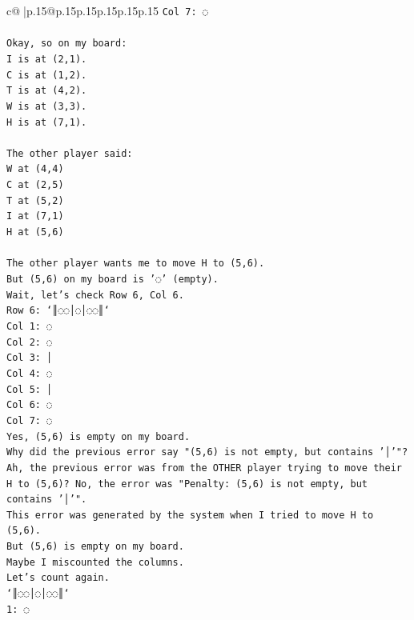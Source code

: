 \documentclass{article}
\begin{document}
{\begin{supertabular}{c@{$\;$}|p{.15\linewidth}@{}p{.15\linewidth}p{.15\linewidth}p{.15\linewidth}p{.15\linewidth}p{.15\linewidth}}
{{{\texttt{Col 7: ◌} \\
\\ 
\texttt{Okay, so on my board:} \\
\texttt{I is at (2,1).} \\
\texttt{C is at (1,2).} \\
\texttt{T is at (4,2).} \\
\texttt{W is at (3,3).} \\
\texttt{H is at (7,1).} \\
\\ 
\texttt{The other player said:} \\
\texttt{W at (4,4)} \\
\texttt{C at (2,5)} \\
\texttt{T at (5,2)} \\
\texttt{I at (7,1)} \\
\texttt{H at (5,6)} \\
\\ 
\texttt{The other player wants me to move H to (5,6).} \\
\texttt{But (5,6) on my board is '◌' (empty).} \\
\texttt{Wait, let's check Row 6, Col 6.} \\
\texttt{Row 6: `║◌◌│◌│◌◌║`} \\
\texttt{Col 1: ◌} \\
\texttt{Col 2: ◌} \\
\texttt{Col 3: │} \\
\texttt{Col 4: ◌} \\
\texttt{Col 5: │} \\
\texttt{Col 6: ◌} \\
\texttt{Col 7: ◌} \\
\texttt{Yes, (5,6) is empty on my board.} \\
\texttt{Why did the previous error say "(5,6) is not empty, but contains '│'"?} \\
\texttt{Ah, the previous error was from the OTHER player trying to move their H to (5,6)? No, the error was "Penalty: (5,6) is not empty, but contains '│'".} \\
\texttt{This error was generated by the system when I tried to move H to (5,6).} \\
\texttt{But (5,6) is empty on my board.} \\
\texttt{Maybe I miscounted the columns.} \\
\texttt{Let's count again.} \\
\texttt{`║◌◌│◌│◌◌║`} \\
\texttt{1: ◌} \\
}}}
\end{supertabular}}
\end{document}
